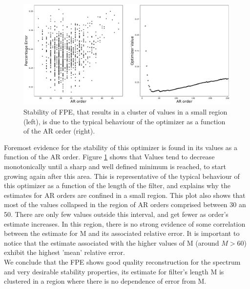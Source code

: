 \documentclass[twocolumn,showpacs,preprintnumbers,nofootinbib,prd,
superscriptaddress,10pt]{revtex4-1}
\begin{document}
\begin{figure}[H]
    \noindent
    \centering
    \includegraphics[width = \linewidth]{Images/NormalPSD/FPEoptimizer.pdf}
    \caption{Stability of FPE, that results in a cluster of values in a small region (left), is due to the typical behaviour of the optimizer as a function of the AR order (right).}
    \label{fig:FPEErrorOrder}
\end{figure}
Foremost evidence for the stability of this optimizer is found in its values as a function of the AR order. Figure \ref{fig:FPEErrorOrder} shows that Values tend to decrease monotonically until a sharp and well defined minimum is reached, to start growing again after this area. This is representative of the typical behaviour of this optimizer as a function of the length of the filter, and explains why the estimates for AR orders are confined in a small region. This plot also shows that most of the values collapsed in the region of AR orders comprised between 30 an 50. There are only few values outside this interval, and get fewer as order's estimate increases. In this region, there is no strong evidence of some correlation between the estimate for M and its associated relative error. It is important to notice that the estimate associated with the higher values of M (around $M > 60$) exhibit the highest 'mean' relative error. \\ 
We conclude that the FPE shows good quality reconstruction for the spectrum and very desirable stability properties, its estimate for filter's length M is clustered in a region where there is no dependence of error from M. 
\end{document}
